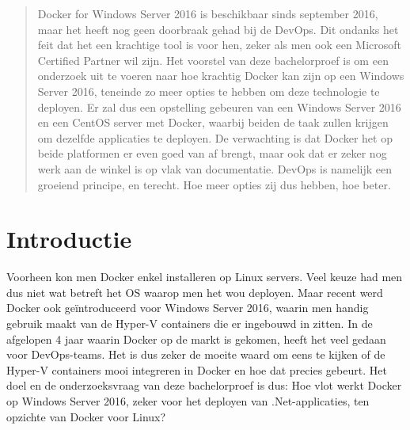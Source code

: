 \documentclass[a0,portrait]{a0poster}
\begin{document}
\begin{multicols}{2} %


\color{HoGentAccent1} %

\begin{abstract}
Docker for Windows Server 2016 is beschikbaar sinds september 2016, maar het heeft nog geen doorbraak gehad bij de DevOps. Dit ondanks het feit dat het een krachtige tool is voor hen, zeker als men ook een Microsoft Certified Partner wil zijn. Het voorstel van deze bachelorproef is om een onderzoek uit te voeren naar hoe krachtig Docker kan zijn op een Windows Server 2016, teneinde zo meer opties te hebben om deze technologie te deployen. Er zal dus een opstelling gebeuren van een Windows Server 2016 en een CentOS server met Docker, waarbij beiden de taak zullen krijgen om dezelfde applicaties te deployen. De verwachting is dat Docker het op beide platformen er even goed van af brengt, maar ook dat er zeker nog werk aan de winkel is op vlak van documentatie. DevOps is namelijk een groeiend principe, en terecht. Hoe meer opties zij dus hebben, hoe beter.
\end{abstract}

\color{HoGentAccent1} 
\section*{Introductie}
\color{black}
\color{black}
Voorheen kon men Docker enkel installeren op Linux servers. Veel keuze had men dus niet wat betreft het OS waarop men het wou deployen. Maar recent werd Docker ook geïntroduceerd voor Windows Server 2016, waarin men handig gebruik maakt van de Hyper-V containers die er ingebouwd in zitten. In de afgelopen 4 jaar waarin Docker op de markt is gekomen, heeft het veel gedaan voor DevOps-teams. Het is dus zeker de moeite waard om eens te kijken of de Hyper-V containers mooi integreren in Docker en hoe dat precies gebeurt. Het doel en de onderzoeksvraag van deze bachelorproef is dus: Hoe vlot werkt Docker op Windows Server 2016, zeker voor het deployen van .Net-applicaties, ten opzichte van Docker voor Linux?


\end{multicols}
\end{document}

